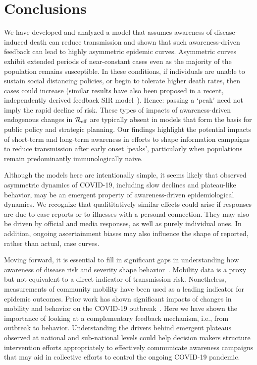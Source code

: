 \section{Conclusions}
We have developed and analyzed
a model that assumes awareness of disease-induced death can 
reduce transmission and shown that such awareness-driven feedback
can lead
to highly asymmetric epidemic curves.  Asymmetric
curves exhibit extended periods of near-constant
cases even as the majority of the population remains susceptible.
In these conditions, if individuals are unable
to sustain social
distancing policies, or begin to tolerate higher death rates, then cases 
could increase (similar results have also been proposed in a recent, independently derived feedback SIR model~\citep{franco2020feedback}). 
Hence: passing a `peak' need not imply
the rapid decline of risk.  These types of impacts of awareness-driven
endogenous changes in ${\cal{R}}_{\mathrm{eff}}$ are typically
absent in models that form the basis for public policy and strategic planning.
Our findings
highlight the potential impacts of short-term and long-term awareness 
in efforts to shape information campaigns
to reduce transmission after early onset `peaks', particularly
when populations remain predominantly immunologically naive.

Although the models here are intentionally simple,
it seems likely that observed asymmetric dynamics of COVID-19, including
slow declines and plateau-like behavior, may be an emergent
property of awareness-driven epidemiological dynamics.
We recognize that qualititatively similar effects could arise 
if responses are due to case reports or to illnesses
with a personal connection. They may also be driven by official and media responses, as well as purely individual ones. In addition, ongoing ascertainment
biases may also influence the shape of reported, rather
than actual, case curves.  

Moving forward, it is essential to fill in significant
gaps in understanding how awareness of disease
risk and severity shape behavior~\citep{west_nat2020}. 
Mobility data is a proxy but
not equivalent to a direct indicator of transmission
risk. Nonetheless, measurements of community
mobility have been
used as a leading indicator for epidemic outcomes.
Prior work has shown significant impacts of changes
in mobility and behavior on the COVID-19 outbreak~\citep{kraemer_2020sci}.
Here we have
shown the importance of looking at a complementary feedback
mechanism,
i.e., from outbreak to behavior.  
Understanding the drivers behind emergent plateaus observed
at national and sub-national levels could help decision
makers structure intervention efforts appropriately to effectively 
communicate awareness campaigns that may aid in collective
efforts to control the ongoing COVID-19 pandemic.

